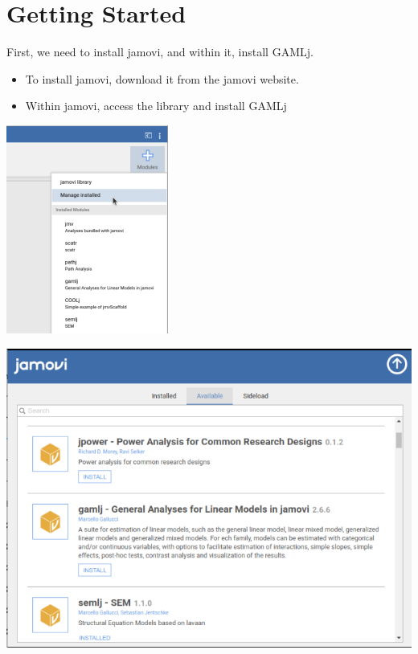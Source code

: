 \documentclass[
]{book}
\begin{document}
\hypertarget{getstarted}{%
\section{Getting Started}\label{getstarted}}

First, we need to install {jamovi}, and within it, install {GAMLj}.

\begin{itemize}
\item
  To install {jamovi}, download it from the jamovi website.
\item
  Within {jamovi}, access the library and install {GAMLj}
\end{itemize}

\includegraphics[width=0.9\linewidth]{bookletpics/0_library1}

\includegraphics[width=0.9\linewidth]{bookletpics/0_library2}
\end{document}
